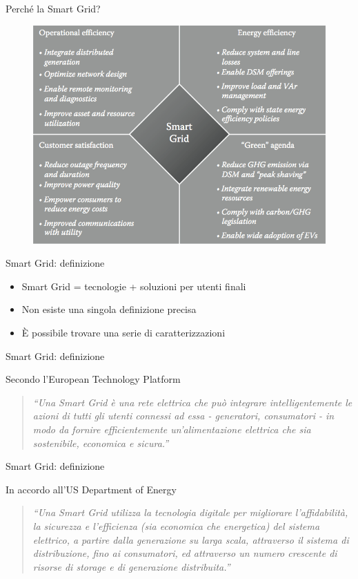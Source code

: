 \begin{frame}{Perché la Smart Grid?}
	\begin{figure}[h] 
		\includegraphics[scale=0.25]{imgs/benefits.png}
	\end{figure}
\end{frame}


\begin{frame}{Smart Grid: definizione}
\begin{itemize}[<+- | alert@+>]
\item Smart Grid = tecnologie + soluzioni per utenti finali
\item Non esiste una singola definizione precisa
\item È possibile trovare una serie di caratterizzazioni
\end{itemize}
\end{frame}

\begin{frame}{Smart Grid: definizione}
\begin{block}{Secondo l’European Technology Platform}
\begin{quote}
\textit{``Una Smart Grid è una rete elettrica che può integrare intelligentemente le azioni di tutti gli utenti connessi ad essa - generatori, consumatori - in modo da fornire efficientemente un’alimentazione elettrica che sia sostenibile, economica e sicura.”}
\end{quote}
\end{block}
\end{frame}

\begin{frame}{Smart Grid: definizione}
\begin{block}{In accordo all’US Department of Energy}
\begin{quote}
\textit{``Una Smart Grid utilizza la tecnologia digitale per migliorare l’affidabilità, la sicurezza e l’efficienza (sia economica che energetica) del sistema elettrico, a partire dalla generazione su larga scala, attraverso il sistema di distribuzione, fino ai consumatori, ed attraverso un numero crescente di risorse di storage e di generazione distribuita.”}
\end{quote}
\end{block}
\end{frame}


